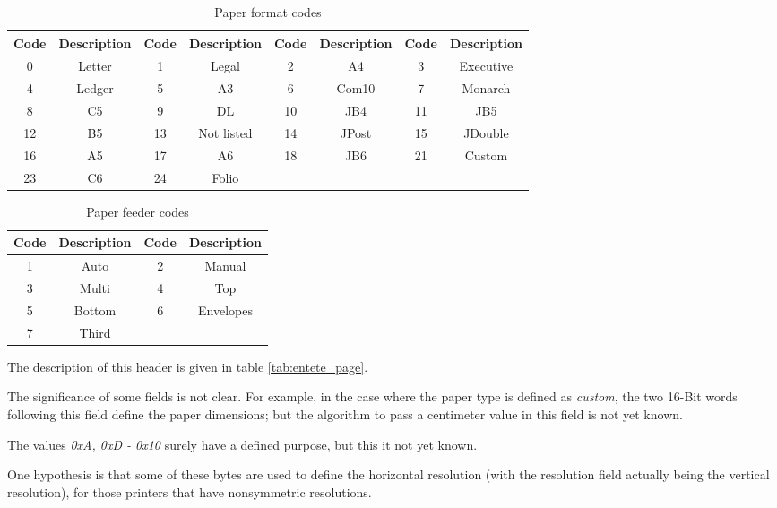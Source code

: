 \begin{table}[ht]
\centering
\begin{tabular}{| c | c || c | c || c | c || c | c |}
\hline
\textbf{Code} & \textbf {Description} & \textbf{Code} & \textbf {Description} &
\textbf{Code} & \textbf {Description} & \textbf{Code} & \textbf {Description} \\
\hline
\hline
0 & Letter & 1 & Legal & 2 & A4 & 3 & Executive \\
4 & Ledger & 5 & A3 & 6 & Com10 & 7 & Monarch \\
8 & C5 & 9 & DL & 10 & JB4 & 11 & JB5 \\
12 & B5 & 13 & Not listed & 14 & JPost & 15 & JDouble \\
16 & A5 & 17 & A6 & 18 & JB6 & 21 & Custom \\
23 & C6 & 24 & Folio & & & &  \\
\hline
\end{tabular}
\caption{Paper format codes}
\label{tab:liste_papiers}
\end{table}


\begin{table}[ht]
\centering
\begin{tabular}{| c | c || c | c |}
\hline
\textbf{Code} & \textbf{Description} & \textbf{Code} & \textbf{Description} \\
\hline
\hline
1 & Auto & 2 & Manual \\
3 & Multi & 4 & Top \\
5 & Bottom & 6 & Envelopes \\
7 & Third  & & \\
\hline
\end{tabular}
\caption{Paper feeder codes}
\label{tab:bac_feuille}
\end{table}

The description of this header is given in table \ref{tab:entete_page}.

The significance of some fields is not clear.
For example, in the case where the paper type is defined as
\emph{custom},
the two 16-Bit words following this field define the paper dimensions;
but the algorithm to pass a centimeter value in this field is
not yet known.

The values \emph{0xA, 0xD - 0x10} surely
have a defined purpose, but this it not yet known.

One hypothesis is
that some of these bytes are used to define the horizontal resolution (with the
resolution field actually being the vertical resolution), for those printers
that have nonsymmetric resolutions.
\bigskip

